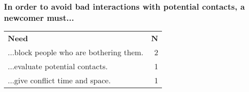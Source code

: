 \subsubsection*{In order to avoid bad interactions with potential contacts, a newcomer must...}

\begin{longtable}{p{}r}
\textbf{Need}                                                                                              & \textbf{N} \\[12pt]
  ...block people who are bothering them.                                                                  & 2 \\
  ...evaluate potential contacts.                                                                          & 1 \\
  ...give conflict time and space.                                                                         & 1 \\
\end{longtable}
